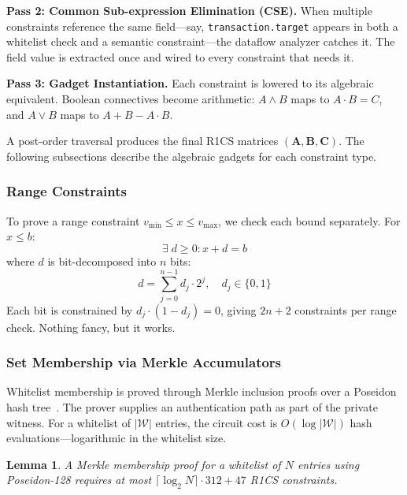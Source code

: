 \documentclass[10pt,conference]{IEEEtran}
\newtheorem{lemma}[theorem]{Lemma}
\begin{document}
\textbf{Pass 2: Common Sub-expression Elimination (CSE).} When multiple constraints reference the same field---say, \texttt{transaction.target} appears in both a whitelist check and a semantic constraint---the dataflow analyzer catches it. The field value is extracted once and wired to every constraint that needs it.

\textbf{Pass 3: Gadget Instantiation.} Each constraint is lowered to its algebraic equivalent. Boolean connectives become arithmetic: $A \land B$ maps to $A \cdot B = C$, and $A \lor B$ maps to $A + B - A \cdot B$.

A post-order traversal produces the final R1CS matrices $(\mathbf{A}, \mathbf{B}, \mathbf{C})$. The following subsections describe the algebraic gadgets for each constraint type.

\subsubsection{Range Constraints}

To prove a range constraint $v_{\min} \leq x \leq v_{\max}$, we check each bound separately. For $x \leq b$:
\begin{equation}
    \exists \; d \geq 0 : x + d = b
\end{equation}
where $d$ is bit-decomposed into $n$ bits:
\begin{equation}
    d = \sum_{j=0}^{n-1} d_j \cdot 2^j, \quad d_j \in \{0, 1\}
\end{equation}
Each bit is constrained by $d_j \cdot (1 - d_j) = 0$, giving $2n + 2$ constraints per range check. Nothing fancy, but it works.

\subsubsection{Set Membership via Merkle Accumulators}

Whitelist membership is proved through Merkle inclusion proofs over a Poseidon hash tree~\cite{grassi2021poseidon}. The prover supplies an authentication path as part of the private witness. For a whitelist of $|\mathcal{W}|$ entries, the circuit cost is $O(\log |\mathcal{W}|)$ hash evaluations---logarithmic in the whitelist size.

\begin{lemma}
\label{lem:merkle_cost}
A Merkle membership proof for a whitelist of $N$ entries using Poseidon-128 requires at most $\lceil \log_2 N \rceil \cdot 312 + 47$ R1CS constraints.
\end{lemma}
\end{document}
